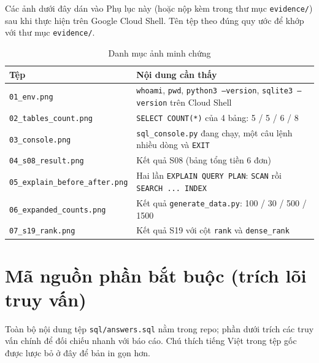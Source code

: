 \documentclass[12pt,a4paper]{article}
\newcommand{\code}[1]{\texttt{\small #1}}
\begin{document}
Các ảnh dưới đây dán vào Phụ lục này (hoặc nộp kèm trong thư mục \code{evidence/}) sau khi thực
hiện trên Google Cloud Shell. Tên tệp theo đúng quy ước để khớp với thư mục \code{evidence/}.

\begin{table}[H]
\centering
\caption{Danh mục ảnh minh chứng}
\label{tab:evidence}
\small
\begin{tabularx}{\linewidth}{@{}l X@{}}
\toprule
\textbf{Tệp} & \textbf{Nội dung cần thấy} \\
\midrule
\code{01\_env.png} & \code{whoami}, \code{pwd}, \code{python3 --version}, \code{sqlite3 --version} trên Cloud Shell \\
\code{02\_tables\_count.png} & \code{SELECT COUNT(*)} của 4 bảng: 5 / 5 / 6 / 8 \\
\code{03\_console.png} & \code{sql\_console.py} đang chạy, một câu lệnh nhiều dòng và \code{EXIT} \\
\code{04\_s08\_result.png} & Kết quả S08 (bảng tổng tiền 6 đơn) \\
\code{05\_explain\_before\_after.png} & Hai lần \code{EXPLAIN QUERY PLAN}: \code{SCAN} rồi \code{SEARCH ... INDEX} \\
\code{06\_expanded\_counts.png} & Kết quả \code{generate\_data.py}: 100 / 30 / 500 / 1500 \\
\code{07\_s19\_rank.png} & Kết quả S19 với cột \code{rank} và \code{dense\_rank} \\
\bottomrule
\end{tabularx}
\end{table}

\section{Mã nguồn phần bắt buộc (trích lõi truy vấn)}

Toàn bộ nội dung tệp \code{sql/answers.sql} nằm trong repo; phần dưới trích các truy vấn chính
để đối chiếu nhanh với báo cáo. Chú thích tiếng Việt trong tệp gốc được lược bỏ ở đây để bản in
gọn hơn.
\end{document}
